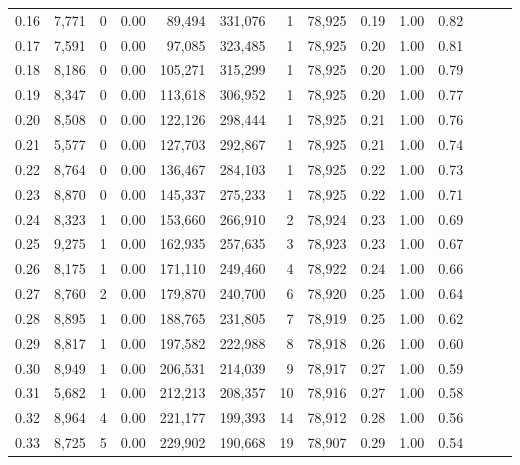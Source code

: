 \begin{tabular}{rrrrrrrrrrrrrr}
0.16 &   7,771 &      0 &  0.00 &   89,494 &  331,076 &       1 &  78,925 &  0.19 &  1.00 &      0.82 \\
0.17 &   7,591 &      0 &  0.00 &   97,085 &  323,485 &       1 &  78,925 &  0.20 &  1.00 &      0.81 \\
0.18 &   8,186 &      0 &  0.00 &  105,271 &  315,299 &       1 &  78,925 &  0.20 &  1.00 &      0.79 \\
0.19 &   8,347 &      0 &  0.00 &  113,618 &  306,952 &       1 &  78,925 &  0.20 &  1.00 &      0.77 \\
0.20 &   8,508 &      0 &  0.00 &  122,126 &  298,444 &       1 &  78,925 &  0.21 &  1.00 &      0.76 \\
0.21 &   5,577 &      0 &  0.00 &  127,703 &  292,867 &       1 &  78,925 &  0.21 &  1.00 &      0.74 \\
0.22 &   8,764 &      0 &  0.00 &  136,467 &  284,103 &       1 &  78,925 &  0.22 &  1.00 &      0.73 \\
0.23 &   8,870 &      0 &  0.00 &  145,337 &  275,233 &       1 &  78,925 &  0.22 &  1.00 &      0.71 \\
0.24 &   8,323 &      1 &  0.00 &  153,660 &  266,910 &       2 &  78,924 &  0.23 &  1.00 &      0.69 \\
0.25 &   9,275 &      1 &  0.00 &  162,935 &  257,635 &       3 &  78,923 &  0.23 &  1.00 &      0.67 \\
0.26 &   8,175 &      1 &  0.00 &  171,110 &  249,460 &       4 &  78,922 &  0.24 &  1.00 &      0.66 \\
0.27 &   8,760 &      2 &  0.00 &  179,870 &  240,700 &       6 &  78,920 &  0.25 &  1.00 &      0.64 \\
0.28 &   8,895 &      1 &  0.00 &  188,765 &  231,805 &       7 &  78,919 &  0.25 &  1.00 &      0.62 \\
0.29 &   8,817 &      1 &  0.00 &  197,582 &  222,988 &       8 &  78,918 &  0.26 &  1.00 &      0.60 \\
0.30 &   8,949 &      1 &  0.00 &  206,531 &  214,039 &       9 &  78,917 &  0.27 &  1.00 &      0.59 \\
0.31 &   5,682 &      1 &  0.00 &  212,213 &  208,357 &      10 &  78,916 &  0.27 &  1.00 &      0.58 \\
0.32 &   8,964 &      4 &  0.00 &  221,177 &  199,393 &      14 &  78,912 &  0.28 &  1.00 &      0.56 \\
0.33 &   8,725 &      5 &  0.00 &  229,902 &  190,668 &      19 &  78,907 &  0.29 &  1.00 &      0.54 \\

\end{tabular}
